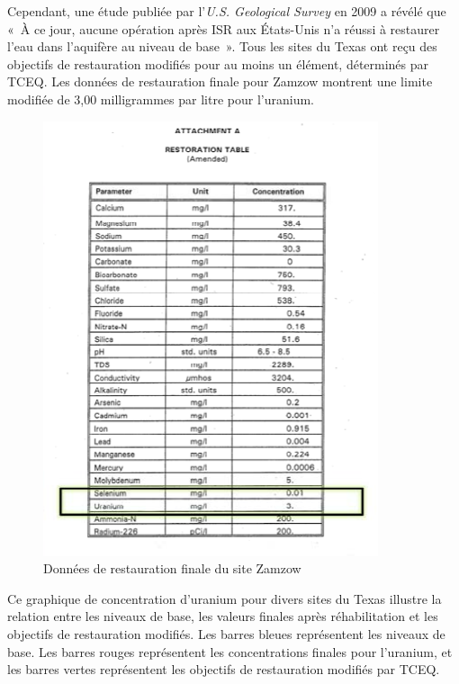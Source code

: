 \documentclass{article}
\begin{document}
Cependant, une étude publiée par l'\textit{U.S. Geological Survey} en 2009 a révélé que « À ce jour, aucune opération après ISR aux États-Unis n'a réussi à restaurer l'eau dans l'aquifère au niveau de base ». Tous les sites du Texas ont reçu des objectifs de restauration modifiés pour au moins un élément, déterminés par TCEQ. Les données de restauration finale pour Zamzow montrent une limite modifiée de 3,00 milligrammes par litre pour l'uranium. 


\begin{figure}[H]
    \centering
    \includegraphics[width=0.7\linewidth]{II_C_3.png}
    \caption{Données de restauration finale du site Zamzow}
    \label{fig:restauration_finale_zamzow}
\end{figure}


Ce graphique de concentration d'uranium pour divers sites du Texas illustre la relation entre les niveaux de base, les valeurs finales après réhabilitation et les objectifs de restauration modifiés. Les barres bleues représentent les niveaux de base. Les barres rouges représentent les concentrations finales pour l'uranium, et les barres vertes représentent les objectifs de restauration modifiés par TCEQ.

\end{document}
